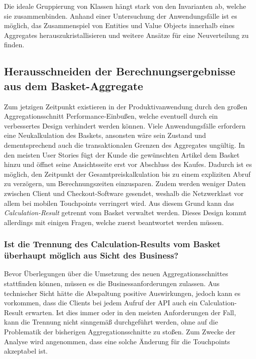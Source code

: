 Die ideale Gruppierung von Klassen hängt stark von den Invarianten ab, welche sie zusammenbinden. Anhand einer Untersuchung der Anwendungsfälle ist es möglich, das Zusammenspiel von Entities und Value Objects innerhalb eines Aggregates herauszukristallisieren und weitere Ansätze für eine Neuverteilung zu finden.

\subsection{Herausschneiden der Berechnungsergebnisse aus dem Basket-Aggregate}

Zum jetzigen Zeitpunkt existieren in der Produktivanwendung durch den großen Aggregationsschnitt Performance-Einbußen, welche eventuell durch ein verbessertes Design verhindert werden können. Viele Anwendungsfälle erfordern eine Neukalkulation des Baskets, ansonsten wäre sein Zustand und dementsprechend auch die transaktionalen Grenzen des Aggregates ungültig. In den meisten User Stories fügt der Kunde die gewünschten Artikel dem Basket hinzu und öffnet seine Ansichtsseite erst vor Abschluss des Kaufes. Dadurch ist es möglich, den Zeitpunkt der Gesamtpreiskalkulation bis zu einem expliziten Abruf zu verzögern, um Berechnungszeiten einzusparen. Zudem werden weniger Daten zwischen Client und Checkout-Software gesendet, weshalb die Netzwerklast vor allem bei mobilen Touchpoints verringert wird. Aus diesem Grund kann das \emph{Calculation-Result} getrennt vom Basket verwaltet werden. Dieses Design kommt allerdings mit einigen Fragen, welche zuerst beantwortet werden müssen.

\subsubsection{Ist die Trennung des Calculation-Results vom Basket überhaupt möglich aus Sicht des Business?}

Bevor Überlegungen über die Umsetzung des neuen Aggregationsschnittes stattfinden können, müssen es die Businessanforderungen zulassen. Aus technischer Sicht hätte die Abspaltung positive Auswirkungen, jedoch kann es vorkommen, dass die Clients bei jedem Aufruf der API auch ein Calculation-Result erwarten. Ist dies immer oder in den meisten Anforderungen der Fall, kann die Trennung nicht sinngemäß durchgeführt werden, ohne auf die Problematik der bisherigen Aggregationsschnitte zu stoßen. Zum Zwecke der Analyse wird angenommen, dass eine solche Änderung für die Touchpoints akzeptabel ist.

